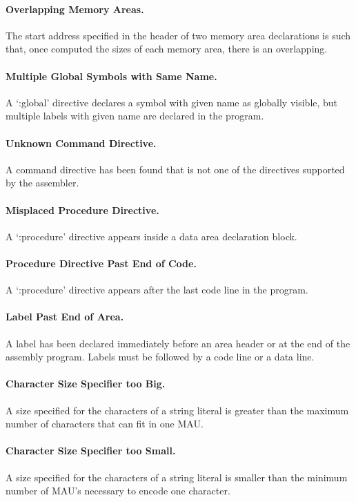 \documentclass[twoside]{tceusermanual}
\begin{document}
\paragraph{Overlapping Memory Areas.}
The start address specified in the header of two memory area declarations is
such that, once computed the sizes of each memory area, there is an
overlapping.

\paragraph{Multiple Global Symbols with Same Name.}
A `:global' directive declares a symbol with given name as globally visible,
but multiple labels with given name are declared in the program.

\paragraph{Unknown Command Directive.}
A command directive has been found that is not one of the directives
supported by the assembler.

\paragraph{Misplaced Procedure Directive.}
A `:procedure' directive appears inside a data area declaration block.

\paragraph{Procedure Directive Past End of Code.}
A `:procedure' directive appears after the last code line in the program.

\paragraph{Label Past End of Area.}
A label has been declared immediately before an area header or at the end of
the assembly program. Labels must be followed by a code line or a data line.

\paragraph{Character Size Specifier too Big.}
A size specified for the characters of a string literal is greater than the
maximum number of characters that can fit in one MAU.

\paragraph{Character Size Specifier too Small.}
A size specified for the characters of a string literal is smaller than the
minimum number of MAU's necessary to encode one character.
\end{document}
